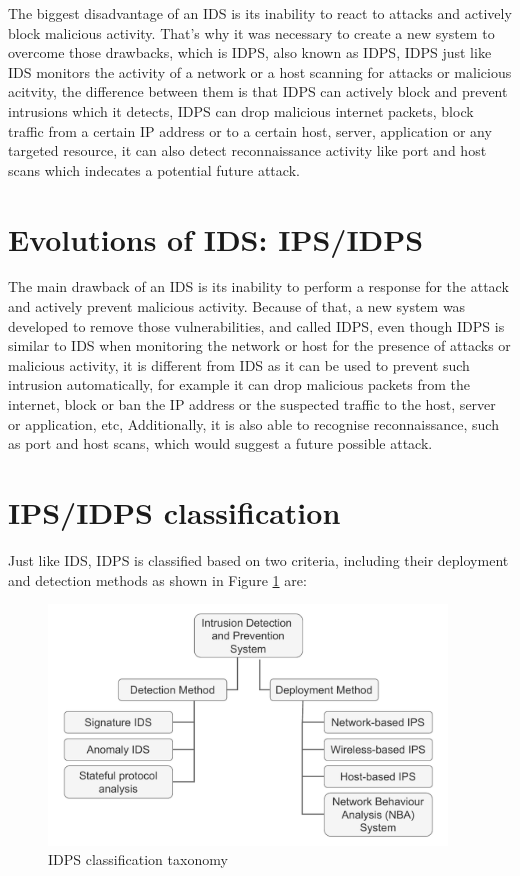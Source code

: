 The biggest disadvantage of an IDS is its inability to react to attacks and actively block malicious activity. That's why it was necessary to create a new system to overcome those drawbacks, which is IDPS, also known as IDPS, IDPS just like IDS monitors the activity of a network or a host scanning for attacks or malicious acitvity, the difference between them is that IDPS can actively block and prevent intrusions which it detects, IDPS can drop malicious internet packets, block traffic from a certain IP address or to a certain host, server, application or any targeted resource, it can also detect reconnaissance activity like port and host scans which indecates a potential future attack.

\section{Evolutions of IDS: IPS/IDPS}
The main drawback of an IDS is its inability to perform a response for the attack and actively prevent malicious activity. Because of that, a new system was developed to remove those vulnerabilities, and called IDPS, even though IDPS is similar to IDS when monitoring the network or host for the presence of attacks or malicious activity, it is different from IDS as it can be used to prevent such intrusion automatically, for example it can drop malicious packets from the internet, block or ban the IP address or the suspected traffic to the host, server or application, etc, Additionally, it is also able to recognise reconnaissance, such as port and host scans, which would suggest a future possible attack. \cite{NIST-IDPS}



\section{IPS/IDPS classification}
Just like IDS, IDPS is classified based on two criteria, including their deployment and detection methods as shown in Figure \ref{fig:IDPS-classification-taxonomy} are:

\begin{figure}[h]
	\centering
	\includegraphics[width=400px]{figures/IDPS_classification.pdf}
	\caption{IDPS classification taxonomy}
	\label{fig:IDPS-classification-taxonomy}
\end{figure}




